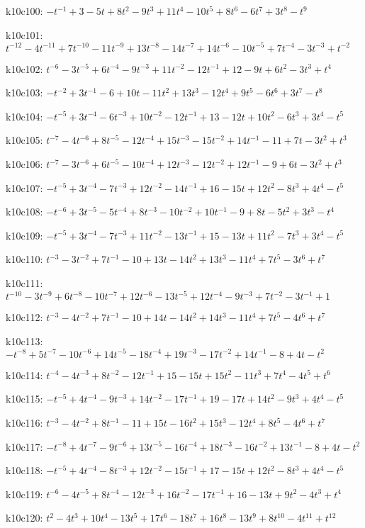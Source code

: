 k10c100: $-t^{-1}+3-5t+8t^{2}-9t^{3}+11t^{4}-10t^{5}+8t^{6}-6t^{7}+3t^{8}-t^{9}$

k10c101: $t^{-12}-4t^{-11}+7t^{-10}-11t^{-9}+13t^{-8}-14t^{-7}+14t^{-6}-10t^{-5}+7t^{-4}-3t^{-3}+t^{-2}$

k10c102: $t^{-6}-3t^{-5}+6t^{-4}-9t^{-3}+11t^{-2}-12t^{-1}+12-9t+6t^{2}-3t^{3}+t^{4}$

k10c103: $-t^{-2}+3t^{-1}-6+10t-11t^{2}+13t^{3}-12t^{4}+9t^{5}-6t^{6}+3t^{7}-t^{8}$

k10c104: $-t^{-5}+3t^{-4}-6t^{-3}+10t^{-2}-12t^{-1}+13-12t+10t^{2}-6t^{3}+3t^{4}-t^{5}$

k10c105: $t^{-7}-4t^{-6}+8t^{-5}-12t^{-4}+15t^{-3}-15t^{-2}+14t^{-1}-11+7t-3t^{2}+t^{3}$

k10c106: $t^{-7}-3t^{-6}+6t^{-5}-10t^{-4}+12t^{-3}-12t^{-2}+12t^{-1}-9+6t-3t^{2}+t^{3}$

k10c107: $-t^{-5}+3t^{-4}-7t^{-3}+12t^{-2}-14t^{-1}+16-15t+12t^{2}-8t^{3}+4t^{4}-t^{5}$

k10c108: $-t^{-6}+3t^{-5}-5t^{-4}+8t^{-3}-10t^{-2}+10t^{-1}-9+8t-5t^{2}+3t^{3}-t^{4}$

k10c109: $-t^{-5}+3t^{-4}-7t^{-3}+11t^{-2}-13t^{-1}+15-13t+11t^{2}-7t^{3}+3t^{4}-t^{5}$

k10c110: $t^{-3}-3t^{-2}+7t^{-1}-10+13t-14t^{2}+13t^{3}-11t^{4}+7t^{5}-3t^{6}+t^{7}$

k10c111: $t^{-10}-3t^{-9}+6t^{-8}-10t^{-7}+12t^{-6}-13t^{-5}+12t^{-4}-9t^{-3}+7t^{-2}-3t^{-1}+1$

k10c112: $t^{-3}-4t^{-2}+7t^{-1}-10+14t-14t^{2}+14t^{3}-11t^{4}+7t^{5}-4t^{6}+t^{7}$

k10c113: $-t^{-8}+5t^{-7}-10t^{-6}+14t^{-5}-18t^{-4}+19t^{-3}-17t^{-2}+14t^{-1}-8+4t-t^{2}$

k10c114: $t^{-4}-4t^{-3}+8t^{-2}-12t^{-1}+15-15t+15t^{2}-11t^{3}+7t^{4}-4t^{5}+t^{6}$

k10c115: $-t^{-5}+4t^{-4}-9t^{-3}+14t^{-2}-17t^{-1}+19-17t+14t^{2}-9t^{3}+4t^{4}-t^{5}$

k10c116: $t^{-3}-4t^{-2}+8t^{-1}-11+15t-16t^{2}+15t^{3}-12t^{4}+8t^{5}-4t^{6}+t^{7}$

k10c117: $-t^{-8}+4t^{-7}-9t^{-6}+13t^{-5}-16t^{-4}+18t^{-3}-16t^{-2}+13t^{-1}-8+4t-t^{2}$

k10c118: $-t^{-5}+4t^{-4}-8t^{-3}+12t^{-2}-15t^{-1}+17-15t+12t^{2}-8t^{3}+4t^{4}-t^{5}$

k10c119: $t^{-6}-4t^{-5}+8t^{-4}-12t^{-3}+16t^{-2}-17t^{-1}+16-13t+9t^{2}-4t^{3}+t^{4}$

k10c120: $t^{2}-4t^{3}+10t^{4}-13t^{5}+17t^{6}-18t^{7}+16t^{8}-13t^{9}+8t^{10}-4t^{11}+t^{12}$

